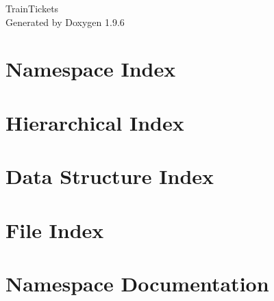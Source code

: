 \documentclass[twoside]{book}
\newcommand{\+}{\discretionary{\mbox{\scriptsize$\hookleftarrow$}}{}{}}
\newcommand{\clearemptydoublepage}{%
    \newpage{\pagestyle{empty}\cleardoublepage}%
  }
\begin{document}
  \raggedbottom
    \hypersetup{pageanchor=false,
                bookmarksnumbered=true,
                pdfencoding=unicode
               }
  \begin{titlepage}
  \vspace*{7cm}
  \begin{center}%
  {\Large Train\+Tickets}\\
  \vspace*{1cm}
  {\large Generated by Doxygen 1.9.6}\\
  \end{center}
  \end{titlepage}
  \clearemptydoublepage
  \tableofcontents
  \clearemptydoublepage
  \hypersetup{pageanchor=true}
\chapter{Namespace Index}

\chapter{Hierarchical Index}

\chapter{Data Structure Index}

\chapter{File Index}

\chapter{Namespace Documentation}










\end{document}

